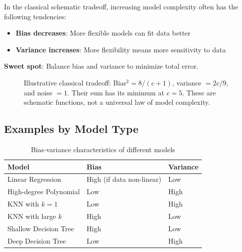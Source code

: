 \documentclass[11pt,twoside]{article}
\numberwithin{equation}{section}
\theoremstyle{plain}
\theoremstyle{definition}
\theoremstyle{remark}
\newenvironment{keyidea}{
  \begin{tcolorbox}[colback=yellow!5!white,
                    colframe=yellow!50!black,
                    title=Key Idea,
                    breakable,
                    enhanced,
                    sharp corners,
                    boxrule=0.8pt,
                    left=6pt, right=6pt, top=6pt, bottom=6pt]
}{
  \end{tcolorbox}
}
\begin{document}
\begin{keyidea}
In the classical schematic tradeoff, increasing model complexity often has the following tendencies:
\begin{itemize}
\item \textbf{Bias decreases}: More flexible models can fit data better
\item \textbf{Variance increases}: More flexibility means more sensitivity to data
\end{itemize}

\textbf{Sweet spot}: Balance bias and variance to minimize total error.

\begin{figure}[H]
\centering
{}
\caption{Illustrative classical tradeoff: Bias$^2=8/(c+1)$, variance $=2c/9$, and noise $=1$. Their sum has its minimum at $c=5$. These are schematic functions, not a universal law of model complexity.}
\end{figure}
\end{keyidea}

\subsection{Examples by Model Type}

\begin{table}[H]
\centering
\begin{tabular}{@{}lll@{}}
\toprule
Model & Bias & Variance \\
\midrule
Linear Regression & High (if data non-linear) & Low \\
High-degree Polynomial & Low & High \\
KNN with $k=1$ & Low & High \\
KNN with large $k$ & High & Low \\
Shallow Decision Tree & High & Low \\
Deep Decision Tree & Low & High \\
\bottomrule
\end{tabular}
\caption{Bias-variance characteristics of different models}
\end{table}
\end{document}
